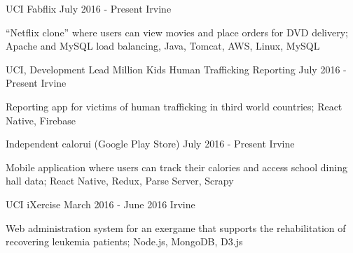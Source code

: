 

\begin{cventries}
	
	\cventry
		{UCI} %
		{Fabflix}
		{July 2016 - Present} %
		{Irvine} %
		{
			\begin{cvitems} %
				\item “Netflix clone” where users can view movies and place orders for DVD delivery; Apache and MySQL load balancing, Java, Tomcat, AWS, Linux, MySQL
			\end{cvitems}
		}
	
  \cventry
	  {UCI, Development Lead} %
	  {Million Kids Human Trafficking Reporting}
	  {July 2016 - Present} %
	  {Irvine} %
	  {
	  	\begin{cvitems} %
	  		\item Reporting app for victims of human trafficking in third world countries; React Native, Firebase
	  		\end{cvitems}
	  	}
  \cventry
    {Independent} %
    {calorui (Google Play Store)}
    {July 2016 - Present} %
    {Irvine} %
    {
      \begin{cvitems} %
        \item Mobile application where users can track their calories and access school dining hall data; React Native, Redux, Parse Server, Scrapy
      \end{cvitems}
    }

  \cventry
    {UCI}
    {iXercise} %
    {March 2016 - June 2016}
    {Irvine} 
    {
      \begin{cvitems} %
        \item Web administration system for an exergame that supports the rehabilitation of recovering leukemia patients; Node.js, MongoDB, D3.js
      \end{cvitems}
    }

\end{cventries}
